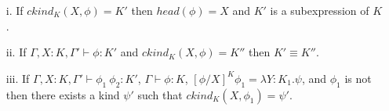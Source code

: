 \begin{lemma}
  \label{lemma:ctype_props_tl_ssfw}
  \begin{itemize}
  \item[]
  \item[i.] If $ckind_K(X,\phi) = K'$ then $head(\phi) = X$ and $K'$ 
    is a subexpression of $K$.
    
  \item[ii.] If $\Gamma,X:K,\Gamma' \vdash \phi:K'$ and $ckind_K(X,\phi) = K''$ then
    $K' \equiv K''$.
    
  \item[iii.] If $\Gamma,X:K,\Gamma' \vdash \phi_1\ \phi_2:K'$, $\Gamma \vdash \phi:K$,
    $[\phi/X]^K \phi_1 = \lambda Y:K_1.\psi$, and $\phi_1$ is not then there exists a kind
    $\psi'$ such that $ckind_K(X,\phi_1) = \psi'$.
  \end{itemize}
\end{lemma}
